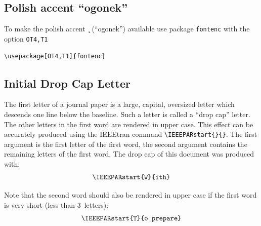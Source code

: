 \documentclass[a4paper,conference]{IEEEtran}
\begin{document}
\subsection{Polish accent ``ogonek''}
To make the polish accent {\k \ } (``ogonek'') available use package \verb|fontenc| with the option \verb|OT4,T1|
\begin{verbatim}
\usepackage[OT4,T1]{fontenc}
\end{verbatim}

\subsection{Initial Drop Cap Letter}
 The first letter of a journal paper is a large, capital, oversized
letter which descends one line below the baseline. Such a
letter is called a ``drop cap'' letter. The other letters in the first
word are rendered in upper case. This effect can be accurately
produced using the IEEEtran command \verb|\IEEEPARstart{}{}|. The first argument is the first letter of the first word, the
second argument contains the remaining letters of the first
word. The drop cap of this document was produced with:
$$\verb|\IEEEPARstart{W}{ith}|$$

Note that the second word should also be rendered  in
upper case if the first word is very short (less than 3~letters):
$$\verb|\IEEEPARstart{T}{o prepare}|$$
\end{document}

